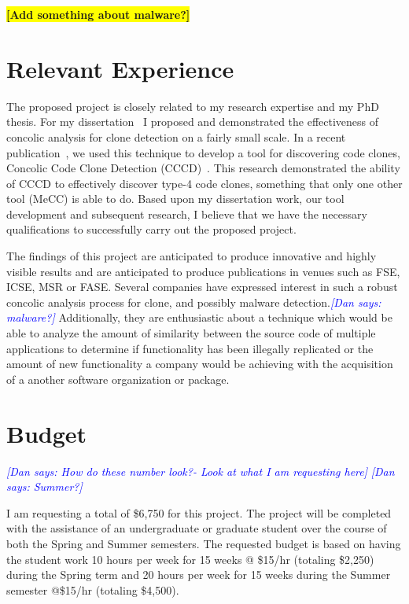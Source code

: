 \documentclass{article}
\newcommand{\todo}[1]{\colorbox{yellow}{\textbf{[#1]}}}
\newcommand{\dan}[1]{\textcolor{blue}{{\it [Dan says: #1]}}}
\begin{document}



\todo{Add something about malware?}



\section{Relevant Experience}


The proposed project is closely related to my research expertise and my PhD thesis. For my dissertation~\cite{Dan123} I proposed and demonstrated the effectiveness of concolic analysis for clone detection on a fairly small scale. In a recent publication~\cite{wcre2013}, we used this technique to develop a tool for discovering code clones, Concolic Code Clone Detection (CCCD)~\cite{wcre2013}. This research demonstrated the ability of CCCD to effectively discover type-4 code clones, something that only one other tool (MeCC) is able to do. Based upon my dissertation work, our tool development and subsequent research, I believe that we have the necessary qualifications to successfully carry out the proposed project.

The findings of this project are anticipated to produce innovative and highly visible results and are anticipated to produce publications in venues such as FSE, ICSE, MSR or FASE. Several companies have expressed interest in such a robust concolic analysis process for clone, and possibly malware detection.\dan{malware?} Additionally, they are enthusiastic about a technique which would be able to analyze the amount of similarity between the source code of multiple applications to determine if functionality has been illegally replicated or the amount of new functionality a company would be achieving with the acquisition of a another software organization or package.




\section{Budget}


\dan{How do these number look?- Look at what I am requesting here}
\dan{Summer?}

I am requesting a total of \$6,750 for this project. The project will be completed with the assistance of an undergraduate or graduate student over the course of both the Spring and Summer semesters. The requested budget is based on having the student work 10 hours per week for 15 weeks @ \$15/hr (totaling \$2,250) during the Spring term and 20 hours per week for 15 weeks during the Summer semester @\$15/hr (totaling \$4,500).
\end{document}
